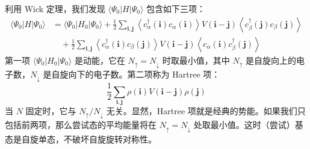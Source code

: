 利用 Wick 定理，我们发现 $\langle\Psi_0|H|\Psi_0\rangle$ 包含如下三项：
\begin{align*}
\langle\Psi_0|H|\Psi_0\rangle &= \langle\Psi_0|H_0|\Psi_0\rangle+\frac{1}{2}\sum_{\pmb{i},\pmb{j}}\left\langle c_{\alpha}^{\dagger}(\pmb{i})c_{\alpha}(\pmb{i})\right\rangle V(\pmb{i}-\pmb{j})\left\langle c_{\beta}^{\dagger}(\pmb{j})c_{\beta}(\pmb{j})\right\rangle\\
&\quad +\frac{1}{2}\sum_{\pmb{i},\pmb{j}}\left\langle c_{\alpha}^{\dagger}(\pmb{i})c_{\beta}(\pmb{j})\right\rangle V(\pmb{i}-\pmb{j})\left\langle c_{\alpha}(\pmb{i})c_{\beta}^{\dagger}(\pmb{j})\right\rangle
\end{align*}
第一项 $\langle\Psi_0|H_0|\Psi_0\rangle$ 是动能，它在 $N_{\uparrow}=N_{\downarrow}$ 时取最小值，其中 $N_{\uparrow}$ 是自旋向上的电子数，$N_{\downarrow}$ 是自旋向下的电子数。第二项称为 Hartree 项：
\begin{equation*}
\frac{1}{2}\sum_{\pmb{i},\pmb{j}}\rho(\pmb{i})V(\pmb{i}-\pmb{j})\rho(\pmb{j})
\end{equation*}
当 $N$ 固定时，它与 $N_{\uparrow}/N_{\downarrow}$ 无关。显然，Hartree 项就是经典的势能。如果我们只包括前两项，那么尝试态的平均能量将在 $N_{\uparrow}=N_{\downarrow}$ 处取最小值。这时（尝试）基态是自旋单态，不破坏自旋旋转对称性。



